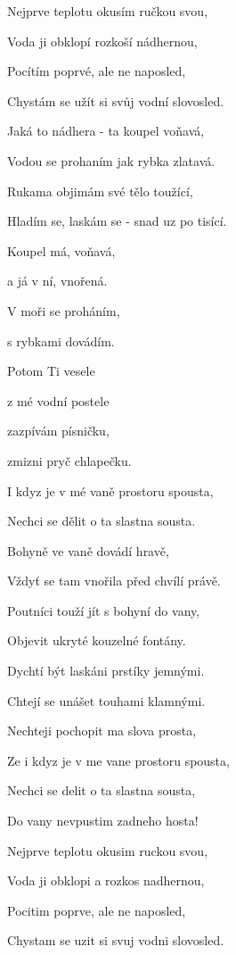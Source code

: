 

\zs
Nejprve teplotu okusím ručkou svou,

Voda ji obklopí rozkoší nádhernou,

Pocítím poprvé, ale ne naposled,

Chystám se užít si svůj vodní slovosled.
\ks

\zs
Jaká to nádhera - ta koupel voňavá,

Vodou se prohaním jak rybka zlatavá.

Rukama objimám své tělo toužící,

Hladím se, laskám se - snad uz po tisící.
\ks

\zr 
Koupel má, voňavá,

a já v ní, vnořená.

V moři se proháním,

s rybkami dovádím.

Potom Ti vesele

z mé vodní postele

zazpívám písničku,

zmizni pryč chlapečku.
\kr

\zs
I kdyz je v mé vaně prostoru spousta, 

Nechci se dělit o ta slastna sousta.

Bohyně ve vaně dovádí hravě,

Vždyť se tam vnořila před chvílí právě.
\ks

\zs
Poutníci touží jít s bohyní do vany,

Objevit ukryté kouzelné fontány.

Dychtí být laskáni prstíky jemnými.

Chtejí se unášet touhami klamnými.
\ks

\zs
Nechteji pochopit ma slova prosta,

Ze i kdyz je v me vane prostoru spousta,

Nechci se delit o ta slastna sousta,

Do vany nevpustim zadneho hosta!
\ks

\zr
\kr

\zs
Nejprve teplotu okusim ruckou svou,

Voda ji obklopi a rozkos nadhernou,

Pocitim poprve, ale ne naposled,

Chystam se uzit si svuj vodni slovosled.
\ks

\kp
